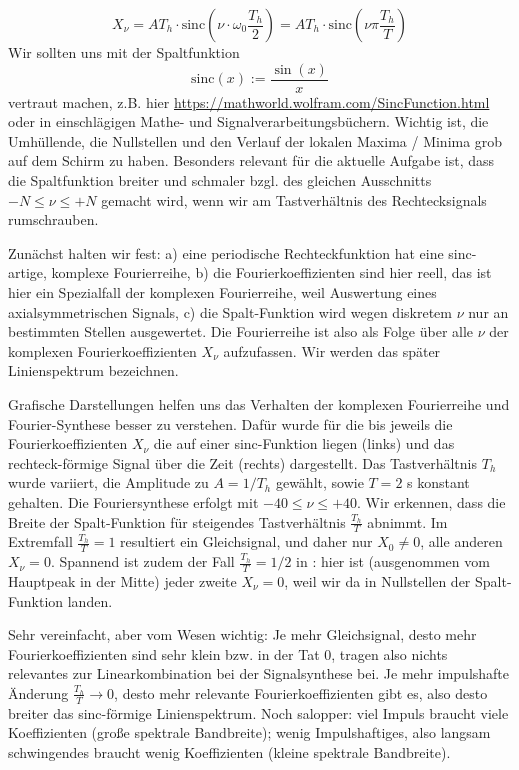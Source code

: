 \begin{Loesung}
%
\begin{equation}
\label{eq:D1483A84E2_Loesung}
 X_\nu = A T_h \cdot \mathrm{sinc}(\nu \cdot \omega_0 \frac{T_h}{2}) = A T_h \cdot \mathrm{sinc}(\nu \pi \frac{T_h}{T})
\end{equation}
%
Wir sollten uns mit der Spaltfunktion
\begin{equation}
\mathrm{sinc}(x) := \frac{\sin(x)}{x}
\end{equation}
vertraut machen, z.B.
hier \url{https://mathworld.wolfram.com/SincFunction.html} oder in einschlägigen
Mathe- und Signalverarbeitungsbüchern. Wichtig ist, die Umhüllende, die Nullstellen
und den Verlauf der lokalen Maxima / Minima grob auf dem Schirm zu haben.
%
Besonders relevant für die aktuelle Aufgabe ist, dass die Spaltfunktion
breiter und schmaler bzgl. des gleichen Ausschnitts
$-N \leq \nu \leq +N$ gemacht wird, wenn wir am Tastverhältnis des Rechtecksignals
rumschrauben.

Zunächst halten wir fest: a) eine periodische Rechteckfunktion hat eine sinc-artige,
komplexe Fourierreihe, b) die Fourierkoeffizienten sind hier reell, das ist
hier ein Spezialfall der komplexen Fourierreihe, weil Auswertung eines
axialsymmetrischen Signals, c) die Spalt-Funktion wird
wegen diskretem $\nu$ nur an bestimmten Stellen ausgewertet.
Die Fourierreihe ist also als Folge
über alle $\nu$ der komplexen Fourierkoeffizienten $X_\nu$ aufzufassen. Wir werden
das später Linienspektrum bezeichnen.

Grafische Darstellungen helfen uns das Verhalten der komplexen Fourierreihe und
Fourier-Synthese besser zu verstehen.
%
Dafür wurde für die  bis 
jeweils die Fourierkoeffizienten $X_\nu$ die auf einer sinc-Funktion liegen (links)
und das rechteck-förmige Signal über die Zeit
(rechts) dargestellt.
Das Tastverhältnis $T_h$ wurde
variiert, die Amplitude zu $A = 1/T_h$ gewählt, sowie $T=2$ s konstant gehalten.
%
Die Fouriersynthese erfolgt mit $-40 \leq \nu \leq +40$.
%
Wir erkennen, dass die Breite der Spalt-Funktion für steigendes Tastverhältnis
$\frac{T_h}{T}$ abnimmt.
%
Im Extremfall $\frac{T_h}{T} = 1$ resultiert ein Gleichsignal, und daher
nur $X_0 \neq 0$, alle anderen $X_\nu=0$.
%
Spannend ist zudem der Fall $\frac{T_h}{T} = 1/2$ in :
hier ist (ausgenommen vom Hauptpeak in der Mitte) jeder zweite $X_\nu=0$,
weil wir da in Nullstellen der Spalt-Funktion landen.

Sehr vereinfacht, aber vom Wesen wichtig:
Je mehr Gleichsignal, desto mehr Fourierkoeffizienten sind sehr klein bzw. in der Tat $0$,
tragen also nichts relevantes zur Linearkombination bei der Signalsynthese bei.
Je mehr impulshafte Änderung
$\frac{T_h}{T} \to  0$, desto mehr relevante Fourierkoeffizienten gibt es,
also desto breiter das sinc-förmige Linienspektrum.
%
Noch salopper: viel Impuls braucht viele Koeffizienten (große spektrale Bandbreite);
wenig Impulshaftiges, also langsam schwingendes braucht wenig Koeffizienten
(kleine spektrale Bandbreite).


\end{Loesung}


